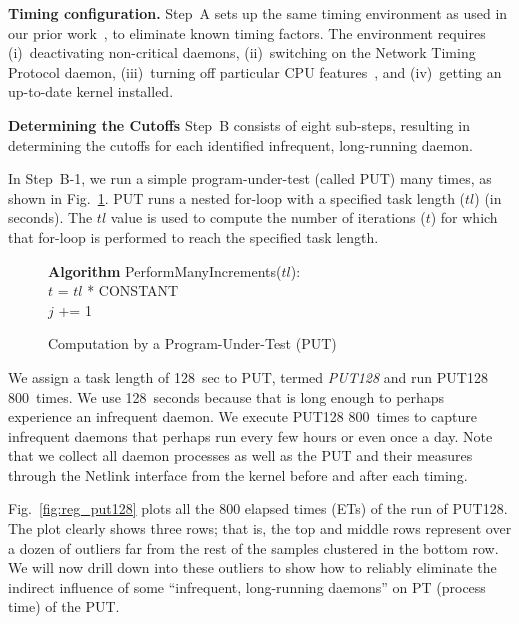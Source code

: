 \documentclass[letter]{ieice}
\begin{document}
{\color{blue}
{\bf Timing configuration.} 
Step~A sets up the same timing environment as used in our prior work~\cite{Currim}, 
to eliminate known timing factors. 
The environment requires (i)~deactivating non-critical daemons, 
(ii)~switching on the Network Timing Protocol daemon,  
(iii)~turning off particular CPU features~\cite{intel15,intelSpeed15}, 
and (iv)~getting an up-to-date kernel installed.

{\bf Determining the Cutoffs}
Step~B consists of eight sub-steps, resulting in determining 
the cutoffs for each identified infrequent, long-running daemon. 

In Step~B-1, we run a simple program-under-test (called PUT) many times, as shown in Fig.~\ref{alg:put}. 
PUT runs a nested for-loop with a specified task length ($tl$) (in seconds). 
The $tl$ value is used to compute 
the number of iterations ($t$) for which that for-loop is performed 
to reach the specified task length.
}

\begin{figure}[h]
\begin{center}
\begin{algorithmic}
{\bf Algorithm} PerformManyIncrements($tl$): \\
\STATE $t$ = $tl$ * {CONSTANT} \\
		\STATE $j$ += 1 \\
	\ENDFOR 
\ENDFOR 
\end{algorithmic}
\end{center}
\caption{Computation by a Program-Under-Test (PUT)\label{alg:put}}
\vspace{-0.25in}
\end{figure}

{\color{blue}
We assign a task length of 128~sec to PUT, termed {\em PUT128} and run PUT128 800~times.
We use 128~seconds because that is long enough to perhaps experience an infrequent daemon. 
We execute PUT128 800~times to capture infrequent daemons that perhaps run every few hours or even 
once a day.} 
Note that we collect all daemon processes as well as the PUT and their measures 
through the Netlink interface from the kernel before and after each 
timing.

Fig.~\ref{fig:reg_put128} plots all the 800 elapsed times (ETs) of the run of PUT128.
The plot clearly shows three rows; that is, 
the top and middle rows represent over a dozen of outliers far from 
the rest of the samples clustered in the bottom row. 
We will now drill down into these outliers to 
show how to reliably eliminate the indirect influence of 
some ``infrequent, \hbox{long-running} daemons'' on PT (\hbox{process} time) of the PUT.
\end{document}
